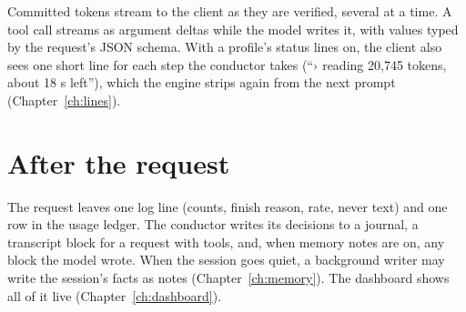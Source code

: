 Committed tokens stream to the client as they are verified, several at a time. A tool call streams as argument deltas while the model writes it, with values typed by the request's JSON schema. With a profile's status lines on, the client also sees one short line for each step the conductor takes (\enquote{› reading 20,745 tokens, about 18 s left}), which the engine strips again from the next prompt (Chapter~\ref{ch:lines}).

\section{After the request}

The request leaves one log line (counts, finish reason, rate, never text) and one row in the usage ledger. The conductor writes its decisions to a journal, a transcript block for a request with tools, and, when memory notes are on, any  block the model wrote. When the session goes quiet, a background writer may write the session's facts as notes (Chapter~\ref{ch:memory}). The dashboard shows all of it live (Chapter~\ref{ch:dashboard}).
